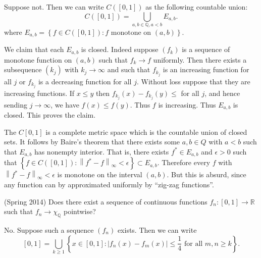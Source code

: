 \documentclass[answers]{exam}
\theoremstyle{problemstyle}
\newcommand{\norm}[1]{\left\lVert#1\right\rVert} %
\newcommand{\1}[1]{\textbf{1}_{\left[#1\right]}} %
\def\R{\mathbb{R}} %
\def\Q{\mathbb{Q}} %
\begin{document}
\begin{questions}

\begin{solution}
  Suppose not. Then we can write $C([0,1])$ as the following countable union:
  \begin{equation}
    C([0,1]) = \bigcup_{a,b\in \Q, a<b}E_{a,b}.
  \end{equation}
  where $E_{a,b}= \left\{ f\in C([0,1]): f \text{ monotone on }(a,b) \right\}.$
  
  We claim that each $E_{a,b}$ is closed. Indeed suppose $(f_{k})$ is a sequence of monotone function on $(a,b)$ such that $f_{k}\to f$ uniformly. Then there exists a subsequence $(k_{j})$ with $k_{j}\to \infty$ and such that $f_{k_{j}}$ is an increasing function for all $j$ or $f_{k_{j}}$ is a decreasing function for all $j$. Without loss suppose that they are increasing functions. If $x\leq y$ then $f_{k_{j}}(x)-f_{k_{j}}(y)\leq $ for all $j$, and hence sending $j\to \infty$, we have $f(x)\leq f(y)$. Thus $f$ is increasing. Thus $E_{a,b}$ is closed. This proves the claim.
  
  The $C[0,1]$ is a complete metric space which is the countable union of closed sets. It follows by Baire's theorem that there exists some $a,b\in Q$ with $a<b$ such that $E_{a,b}$ has nonempty interior. That is, there exists $f^{*}\in E_{a,b}$ and $\epsilon>0$ such that $\left\{ f\in C([0,1]): \norm{f^{*}-f}_{\infty} < \epsilon\right\}\subset E_{a,b}.$ Therefore every $f$ with $\norm{f^{*}-f}_{\infty}<\epsilon$ is monotone on the interval $(a,b)$. But this is absurd, since any function can by approximated uniformly by ``zig-zag functions''.

\end{solution}

\item (Spring 2014)
  Does there exist a sequence of continuous functions $f_{n}:[0,1]\to \R$ such that $f_{n}\to \chi_{\Q}$ pointwise?

\begin{solution}
  No. Suppose such a sequence $(f_{n})$ exists. Then we can write
  \begin{equation*}
    \left[ 0,1 \right] = \bigcup_{k\geq 1} \left\{ x\in [0,1]: \left| f_{n}(x)-f_{m}(x) \right| \leq \frac{1}{4} \text{ for all }m,n\geq k\right\}.
  \end{equation*}


\end{solution}
\end{questions}
\end{document}

